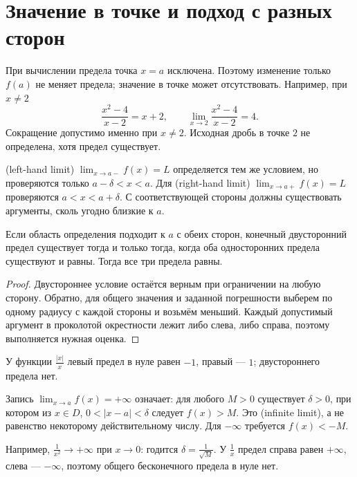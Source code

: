 \section{Значение в точке и подход с разных сторон}

При вычислении предела точка \(x=a\) исключена. Поэтому изменение только \(f(a)\) не меняет предела; значение в точке может отсутствовать. Например, при \(x\ne2\)
\[
\frac{x^2-4}{x-2}=x+2,
\qquad \lim_{x\to2}\frac{x^2-4}{x-2}=4.
\]
Сокращение допустимо именно при \(x\ne2\). Исходная дробь в точке \(2\) не определена, хотя предел существует.

\begin{definition}
 (left-hand limit) \(\lim_{x\to a-}f(x)=L\) определяется тем же условием, но проверяются только \(a-\delta<x<a\). Для  (right-hand limit) \(\lim_{x\to a+}f(x)=L\) проверяются \(a<x<a+\delta\). С соответствующей стороны должны существовать аргументы, сколь угодно близкие к \(a\).
\end{definition}

\begin{theorem}\label{thm:legacy-c19-2}
Если область определения подходит к \(a\) с обеих сторон, конечный двусторонний предел существует тогда и только тогда, когда оба односторонних предела существуют и равны. Тогда все три предела равны.
\end{theorem}
\begin{proof}
Двустороннее условие остаётся верным при ограничении на любую сторону. Обратно, для общего значения и заданной погрешности выберем по одному радиусу с каждой стороны и возьмём меньший. Каждый допустимый аргумент в проколотой окрестности лежит либо слева, либо справа, поэтому выполняется нужная оценка.
\end{proof}

У функции \(\frac{|x|}{x}\) левый предел в нуле равен \(-1\), правый --- \(1\); двустороннего предела нет.

\begin{definition}
Запись \(\lim_{x\to a}f(x)=+\infty\) означает: для любого \(M>0\) существует \(\delta>0\), при котором из \(x\in D\), \(0<|x-a|<\delta\) следует \(f(x)>M\). Это  (infinite limit), а не равенство некоторому действительному числу. Для \(-\infty\) требуется \(f(x)<-M\).
\end{definition}

Например, \(\frac1{x^2}\to+\infty\) при \(x\to0\): годится \(\delta=\frac1{\sqrt M}\). У \(\frac1x\) предел справа равен \(+\infty\), слева --- \(-\infty\), поэтому общего бесконечного предела в нуле нет.


